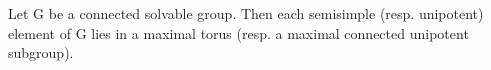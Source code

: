 Let G be a connected solvable group. Then each semisimple (resp. unipotent) element of G lies in a maximal torus (resp. a maximal connected unipotent subgroup).
